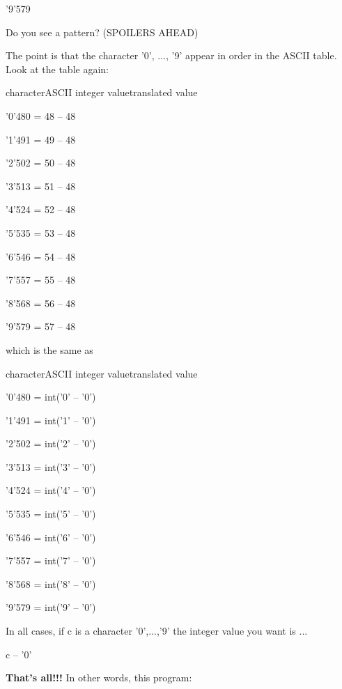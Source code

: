 \documentclass[
]{article}
\begin{document}
'9'579

Do you see a pattern? (SPOILERS AHEAD)

The point is that the character '0', ..., '9' appear in order in the
ASCII table. Look at the table again:

characterASCII integer valuetranslated value

'0'480 = 48 -- 48

'1'491 = 49 -- 48

'2'502 = 50 -- 48

'3'513 = 51 -- 48

'4'524 = 52 -- 48

'5'535 = 53 -- 48

'6'546 = 54 -- 48

'7'557 = 55 -- 48

'8'568 = 56 -- 48

'9'579 = 57 -- 48

which is the same as

characterASCII integer valuetranslated value

'0'480 = int('0' -- '0')

'1'491 = int('1' -- '0')

'2'502 = int('2' -- '0')

'3'513 = int('3' -- '0')

'4'524 = int('4' -- '0')

'5'535 = int('5' -- '0')

'6'546 = int('6' -- '0')

'7'557 = int('7' -- '0')

'8'568 = int('8' -- '0')

'9'579 = int('9' -- '0')

In all cases, if c is a character '0',...,'9' the integer value you want
is ...

c -- '0'

\textbf{That's all!!! }In other words, this program:
\end{document}
